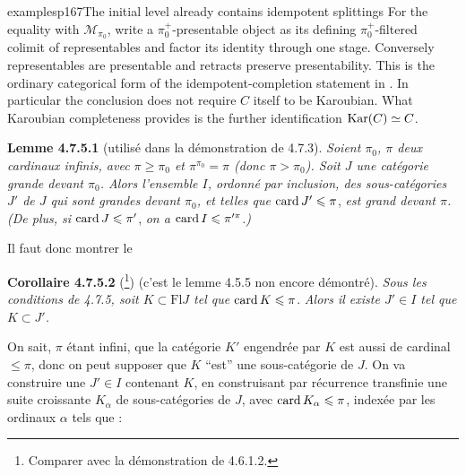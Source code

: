\begin{dcomment}{examples}{p167}{The initial level already contains idempotent splittings}
For the equality with $\mathcal M_{\pi_0}$, write a $\pi_0^+$-presentable object as its defining $\pi_0^+$-filtered colimit of representables and factor its identity through one stage. Conversely representables are presentable and retracts preserve presentability. This is the ordinary categorical form of the idempotent-completion statement in \citet[Lemma 5.4.2.4]{Lurie2009HTT}. In particular the conclusion does not require $C$ itself to be Karoubian. What Karoubian completeness provides is the further identification $\operatorname{Kar}(C)\simeq C$.
\end{dcomment}


\textbf{Lemme 4.7.5.1} (utilisé dans la démonstration de 4.7.3). \textit{Soient $\pi_0$, $\pi$ deux cardinaux infinis, avec $\pi \geqslant \pi_0$ et $\pi^{\pi_0} = \pi$ (donc $\pi > \pi_0$). Soit $J$ une catégorie grande devant $\pi_0$. Alors l’ensemble $I$, ordonné par inclusion, des sous-catégories $J'$ de $J$ qui sont grandes devant $\pi_0$, et telles que} $\operatorname{card} J' \leqslant \pi$, \textit{est grand devant $\pi$. (De plus, si} $\operatorname{card} J \leqslant \pi'$, \textit{on a} $\operatorname{card} I \leqslant \pi'^{\pi}$\textit{.)}

Il faut donc montrer le

\textbf{Corollaire 4.7.5.2} (\footnote[70]{Comparer avec la démonstration de 4.6.1.2.}) (c’est le lemme 4.5.5 non encore démontré). \textit{Sous les conditions de 4.7.5, soit $K \subset \mathrm{Fl} J$ tel que} $\operatorname{card} K \leqslant \pi$. \textit{Alors il existe $J' \in I$ tel que $K \subset J'$.}

On sait, $\pi$ étant infini, que la catégorie $K'$ engendrée par $K$ est aussi de cardinal $\leqslant \pi$, donc on peut supposer que $K$ “est” une sous-catégorie de $J$. On va construire une $J' \in I$ contenant $K$, en construisant par récurrence transfinie une suite croissante $K_{\alpha}$ de sous-catégories de $J$, avec $\operatorname{card} K_{\alpha} \leqslant \pi$, indexée par les ordinaux $\alpha$ tels que \fbox{$\card \alpha \leqslant \pi$} :

